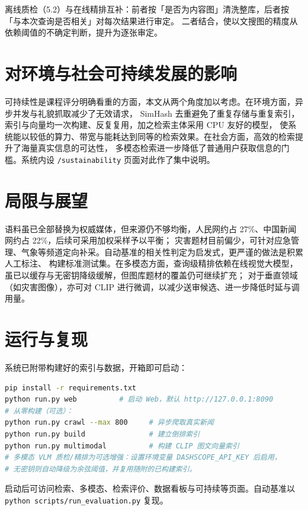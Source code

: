 \documentclass[11pt,a4paper]{ctexart}
\begin{document}
离线质检（5.2）与在线精排互补：前者按「是否为内容图」清洗整库，后者按「与本次查询是否相关」对每次结果进行审定。
二者结合，使以文搜图的精度从依赖阈值的不确定判断，提升为逐张审定。

\section{对环境与社会可持续发展的影响}

可持续性是课程评分明确看重的方面，本文从两个角度加以考虑。在环境方面，异步并发与礼貌抓取减少了无效请求，
SimHash 去重避免了重复存储与重复索引，索引与向量均一次构建、反复复用，加之检索主体采用 CPU 友好的模型，
使系统能以较低的算力、带宽与能耗达到同等的检索效果。在社会方面，高效的检索提升了海量真实信息的可达性，
多模态检索进一步降低了普通用户获取信息的门槛。系统内设 \texttt{/sustainability} 页面对此作了集中说明。

\section{局限与展望}

语料虽已全部替换为权威媒体，但来源仍不够均衡，人民网约占 27\%、中国新闻网约占 22\%，后续可采用加权采样予以平衡；
灾害题材目前偏少，可针对应急管理、气象等频道定向补采。自动基准的相关性判定为启发式，更严谨的做法是积累人工标注、
构建标准测试集。在多模态方面，查询级精排依赖在线视觉大模型，虽已以缓存与无密钥降级缓解，但图库题材的覆盖仍可继续扩充；
对于垂直领域（如灾害图像），亦可对 CLIP 进行微调，以减少送审候选、进一步降低时延与调用量。

\section{运行与复现}

系统已附带构建好的索引与数据，开箱即可启动：

\begin{lstlisting}[language=bash]
pip install -r requirements.txt
python run.py web          # 启动 Web，默认 http://127.0.0.1:8090
# 从零构建（可选）：
python run.py crawl --max 800     # 异步爬取真实新闻
python run.py build               # 建立倒排索引
python run.py multimodal          # 构建 CLIP 图文向量索引
# 多模态 VLM 质检/精排为可选增强：设置环境变量 DASHSCOPE_API_KEY 后启用，
# 无密钥则自动降级为余弦阈值，并复用随附的已构建索引。
\end{lstlisting}

\noindent
启动后可访问检索、多模态、检索评价、数据看板与可持续等页面。自动基准以 \texttt{python scripts/run\_evaluation.py} 复现。
\end{document}

